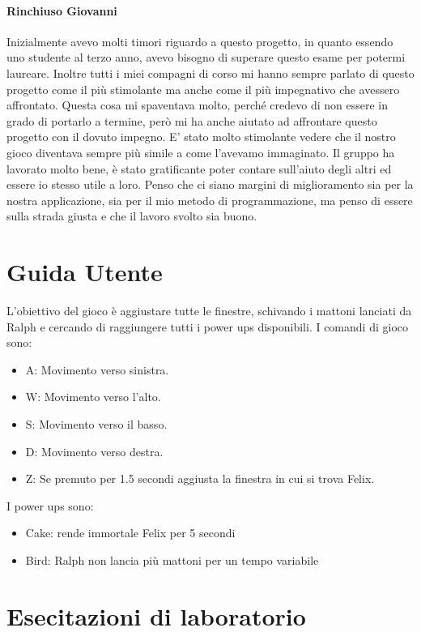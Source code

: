 \documentclass[a4paper,12pt]{report}
\begin{document}
\begin{itemize}
\begin{itemsize}
\subsubsection{Rinchiuso Giovanni}
Inizialmente avevo molti timori riguardo a questo progetto, in quanto essendo uno studente al terzo anno, avevo bisogno di superare questo esame per potermi laureare. Inoltre tutti i miei compagni di corso mi hanno sempre parlato di questo progetto come il più stimolante ma anche come il più impegnativo che avessero affrontato. Questa cosa mi spaventava molto, perché credevo di non essere in grado di portarlo a termine, però mi ha anche aiutato ad affrontare questo progetto con il dovuto impegno. E' stato molto stimolante vedere che il nostro gioco diventava sempre più simile a come l'avevamo immaginato. Il gruppo ha lavorato molto bene, è stato gratificante poter contare sull'aiuto degli altri ed essere io stesso utile a loro. Penso che ci siano margini di miglioramento sia per la nostra applicazione, sia per il mio metodo di programmazione, ma penso di essere sulla strada giusta e che il lavoro svolto sia buono. 

\appendix
\chapter{Guida Utente}
L'obiettivo del gioco è aggiustare tutte le finestre, schivando i mattoni lanciati da Ralph e cercando di raggiungere tutti i power ups disponibili.
I comandi di gioco sono:
\begin{itemize}
 \item A: Movimento verso sinistra.
 \item W: Movimento verso l'alto.
 \item S: Movimento verso il basso.
 \item D: Movimento verso destra.
 \item Z: Se premuto per 1.5 secondi aggiusta la finestra in cui si trova Felix.
\end{itemize}
I power ups sono:
\begin{itemize}
 \item Cake: rende immortale Felix per 5 secondi
 \item Bird: Ralph non lancia più mattoni per un tempo variabile
\end{itemize}
\chapter{Esecitazioni di laboratorio} 


\end{itemsize}
\end{itemize}
\end{document}
